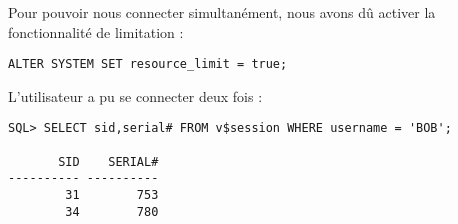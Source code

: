 Pour pouvoir nous connecter simultanément, nous avons dû activer la
fonctionnalité de limitation :
\begin{verbatim}
ALTER SYSTEM SET resource_limit = true;
\end{verbatim}

L’utilisateur a pu se connecter deux fois :
\begin{verbatim}
SQL> SELECT sid,serial# FROM v$session WHERE username = 'BOB';

       SID    SERIAL#                                                           
---------- ----------                                                           
        31        753                                                           
        34        780                                                           
\end{verbatim}
